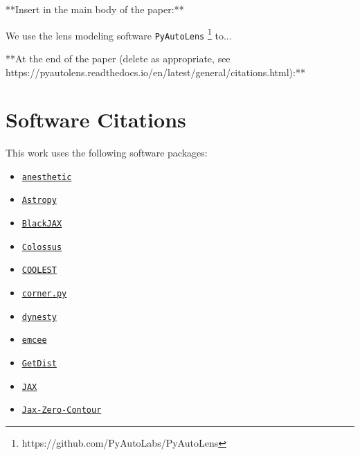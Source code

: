 **Insert in the main body of the paper:**

We use the lens modeling software \texttt{PyAutoLens} \footnote{https://github.com/PyAutoLabs/PyAutoLens} \citep{pyautolens, Nightingale2015, Nightingale2018} to...

**At the end of the paper (delete as appropriate, see https://pyautolens.readthedocs.io/en/latest/general/citations.html):**

\section*{Software Citations}

This work uses the following software packages:

\begin{itemize}

\item
\href{https://github.com/handley-lab/anesthetic}{\texttt{anesthetic}}
\citep{anesthetic}

\item
\href{https://github.com/astropy/astropy}{\texttt{Astropy}}
\citep{astropy1, astropy2}

\item
\href{https://github.com/blackjax-devs/blackjax}{\texttt{BlackJAX}}
\citep{blackjax}

\item
\href{https://bitbucket.org/bdiemer/colossus/src/main/}{\texttt{Colossus}}
\citep{colossus}

\item
\href{https://github.com/aymgal/COOLEST}{\texttt{COOLEST}}
\citep{coolest}

\item
\href{https://github.com/dfm/corner.py}{\texttt{corner.py}}
\citep{corner}

\item
\href{https://github.com/joshspeagle/dynesty}{\texttt{dynesty}}
\citep{dynesty, dynesty4}

\item
\href{https://github.com/dfm/emcee}{\texttt{emcee}}
\citep{emcee}

\item
\href{https://github.com/cmbant/getdist}{\texttt{GetDist}}
\citep{getdist}

\item
\href{https://github.com/jax-ml/jax}{\texttt{JAX}}
\citep{jax}

\item
\href{https://github.com/CKrawczyk/Jax-Zero-Contour}{\texttt{Jax-Zero-Contour}}
\citep{jax_zero_contour}


\end{itemize}
